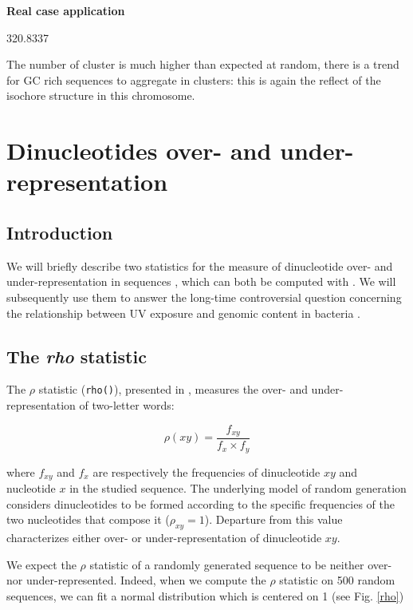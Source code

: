 \documentclass{article}
\begin{document}
\noindent\textbf{Real case application}

\begin{Schunk}
\begin{Soutput}
[1] 320.8337
\end{Soutput}
\end{Schunk}

The number of cluster is much higher than expected at random, there is a trend for
GC rich sequences to aggregate in clusters: this is again the reflect of the isochore
structure in this chromosome.

\section{Dinucleotides over- and under-representation}
\label{dinu}

\subsection{Introduction}

We will briefly describe two statistics for the measure of
dinucleotide over- and under-representation in sequences
\cite{Karlin,UV}, which can both be computed with \seqinr{}. We will
subsequently use them to answer the long-time controversial question
concerning the relationship between UV exposure and genomic content in
bacteria \cite{Singer,Bak}.

\subsection{The \textit{rho} statistic}

The $\rho$ statistic (\texttt{rho()}), presented in \cite{Karlin},
measures the over- and under-representation of two-letter words:

$$\rho(xy) = \frac{f_{xy}}{f_{x}\times f_{y}}$$

where $f_{xy}$ and $f_{x}$ are respectively the frequencies of
dinucleotide $xy$ and nucleotide $x$ in the studied sequence. The
underlying model of random generation considers dinucleotides to be
formed according to the specific frequencies of the two nucleotides
that compose it ($\rho_{xy} = 1$). Departure from this value
characterizes either over- or under-representation of dinucleotide
$xy$.


We expect the $\rho$ statistic of a randomly generated sequence to be
neither over- nor under-represented. Indeed, when we compute the
$\rho$ statistic on 500 random
sequences, we can fit a normal distribution which is centered on 1
(see Fig. \ref{rho})
\end{document}
